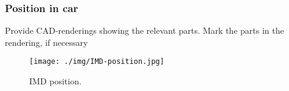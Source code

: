 \subsubsection{Position in car}
Provide CAD-renderings showing the relevant parts. Mark the parts in the rendering, if necessary

\begin{figure}[H]
	\centering
	\texttt{[image: ./img/IMD-position.jpg]}
	\caption{IMD position.}
	\label{fig:IMD-position}
\end{figure}
